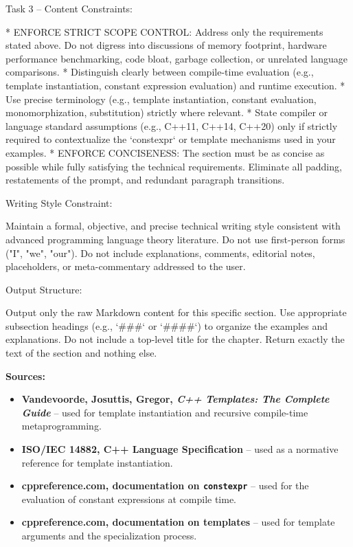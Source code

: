 \documentclass[11pt]{report}
\begin{document}
\begin{PromptVerbatim}
Task 3 -- Content Constraints:

* ENFORCE STRICT SCOPE CONTROL: Address only the requirements stated above. Do not digress into discussions of memory footprint, hardware performance benchmarking, code bloat, garbage collection, or unrelated language comparisons.
* Distinguish clearly between compile-time evaluation (e.g., template instantiation, constant expression evaluation) and runtime execution.
* Use precise terminology (e.g., template instantiation, constant evaluation, monomorphization, substitution) strictly where relevant.
* State compiler or language standard assumptions (e.g., C++11, C++14, C++20) only if strictly required to contextualize the `constexpr` or template mechanisms used in your examples.
* ENFORCE CONCISENESS: The section must be as concise as possible while fully satisfying the technical requirements. Eliminate all padding, restatements of the prompt, and redundant paragraph transitions.

Writing Style Constraint:

Maintain a formal, objective, and precise technical writing style consistent with advanced programming language theory literature. Do not use first-person forms ("I", "we", "our"). Do not include explanations, comments, editorial notes, placeholders, or meta-commentary addressed to the user.

Output Structure:

Output only the raw Markdown content for this specific section. Use appropriate subsection headings (e.g., `###` or `####`) to organize the examples and explanations. Do not include a top-level title for the chapter. Return exactly the text of the section and nothing else.
\end{PromptVerbatim}

\noindent\textbf{Sources:}
\begin{itemize}
\item \textbf{Vandevoorde, Josuttis, Gregor, \emph{C++ Templates: The Complete Guide}} \cite{cpp_templates2017} -- used for template instantiation and recursive compile-time metaprogramming.
\item \textbf{ISO/IEC 14882, C++ Language Specification} \cite{iso14882} -- used as a normative reference for template instantiation.
\item \textbf{cppreference.com, documentation on \texttt{constexpr}} \cite{cppreference_constexpr} -- used for the evaluation of constant expressions at compile time.
\item \textbf{cppreference.com, documentation on templates} \cite{cppreference_templates} -- used for template arguments and the specialization process.
\end{itemize}
\end{document}
